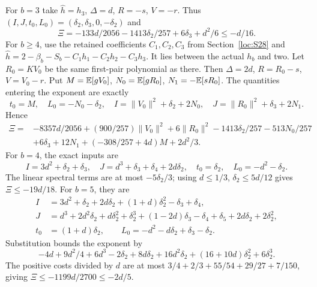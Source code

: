 For $b=3$ take $\widehat h=h_3$, $\Delta=d$, $R=-s$, $V=-r$.
Thus $(I,J,t_0,L_0)=(\delta_{2},\delta_{3},0,-\delta_{2})$ and
\[
 \Xi=-133d/2056-1413\delta_{2}/257+6\delta_{3}+d^2/6\le-d/16.
\]
For $b\ge4$, use the retained coefficients $C_1,C_2,C_3$ from
Section~\ref{loc:S28} and
$\widehat h=2-\beta_b-S_b-C_1h_1-C_2h_2-C_3h_3$.
It lies between the actual $h_b$ and two.
Let $R_0=KV_0$ be the same first-pair polynomial as there.
Then $\Delta=2d$, $R=R_0-s$, $V=V_0-r$.
Put $M=\mathbb E[gV_0]$, $N_0=\mathbb E[gR_0]$, $N_1=-\mathbb E[sR_0]$.
The quantities entering the exponent are exactly
\[
 t_0=M,\quad L_0=-N_0-\delta_{2},\quad
 I=\|V_0\|^2+\delta_{2}+2N_0,\quad J=\|R_0\|^2+\delta_{3}+2N_1.
\]
Hence
\begin{align*}
 \Xi={}&-8357d/2056+(900/257)\|V_0\|^2+6\|R_0\|^2
 -1413\delta_{2}/257-513N_0/257\\
 &+6\delta_{3}+12N_1+(-308/257+4d)M+2d^2/3.
\end{align*}
For $b=4$, the exact inputs are
\[
 I=3d^2+\delta_{2}+\delta_{3},\quad J=d^3+\delta_{3}+\delta_{4}+2d\delta_{2},
 \quad t_0=\delta_{2},\quad L_0=-d^2-\delta_{2}.
\]
The linear spectral terms are at most $-5\delta_{2}/3$;
using $d\le1/3$, $\delta_{2}\le5d/12$ gives $\Xi\le-19d/18$.
For $b=5$, they are
\begin{align*}
 I&=3d^2+\delta_{2}+2d\delta_{2}+(1+d)\delta_{2}^2-\delta_{3}+\delta_{4},\\
 J&=d^3+2d^2\delta_{2}+d\delta_{2}^2+\delta_{2}^3+(1-2d)\delta_{3}-\delta_{4}+\delta_{5}
                                      +2d\delta_{2}+2\delta_{2}^2,\\
 t_0&=(1+d)\delta_{2},\qquad L_0=-d^2-d\delta_{2}+\delta_{3}-\delta_{2}.
\end{align*}
Substitution bounds the exponent by
\[
 -4d+9d^2/4+6d^3-2\delta_{2}+8d\delta_{2}+16d^2\delta_{2}+(16+10d)\delta_{2}^2+6\delta_{2}^3.
\]
The positive costs divided by $d$ are at most
$3/4+2/3+55/54+29/27+7/150$, giving
$\Xi\le-1199d/2700\le-2d/5$.

